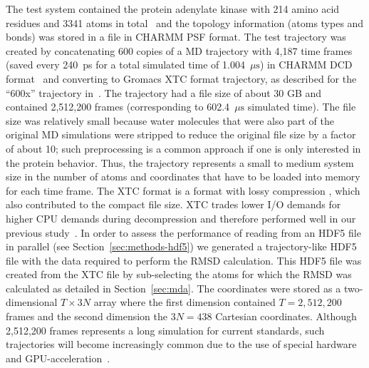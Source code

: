 The test system contained the protein adenylate kinase with 214 amino acid residues and 3341 atoms in total~\cite{Seyler:2014il} and the topology information (atoms types and bonds) was stored in a file in CHARMM PSF format.
The test trajectory was created by concatenating 600 copies of a MD trajectory with 4,187 time frames (saved every 240~ps for a total simulated time of 1.004~$\mu\text{s}$) in CHARMM DCD format~\cite{Seyler:2017aa} and converting to Gromacs XTC format trajectory, as described for the ``600x'' trajectory in~\citet{Khoshlessan:2017ab}.
The trajectory had a file size of about 30 GB and contained 2,512,200 frames (corresponding to 602.4~$\mu\text{s}$ simulated time).
The file size was relatively small because water molecules that were also part of the original MD simulations were stripped to reduce the original file size by a factor of about 10; such preprocessing is a common approach if one is only interested in the protein behavior.
Thus, the trajectory represents a small to medium system size in the number of atoms and coordinates that have to be loaded into memory for each time frame.
The XTC format is a format with lossy compression \cite{Lindahl01, Spangberg:2011zr}, which also contributed to the compact file size.
XTC trades lower I/O demands for higher CPU demands during decompression and therefore performed well in our previous study~\cite{Khoshlessan:2017ab}.
In order to assess the performance of reading from an HDF5 file in parallel (see Section~\ref{sec:methods-hdf5}) we generated a trajectory-like HDF5 file with the data required to perform the RMSD calculation.
This HDF5 file was created from the XTC file by sub-selecting the atoms for which the RMSD was calculated as detailed in Section~\ref{sec:mda}.
The coordinates were stored as a two-dimensional $T \times 3N$ array where the first dimension contained $T=2,512,200$ frames and the second dimension the $3N = 438$ Cartesian coordinates.
Although 2,512,200 frames represents a long simulation for current standards, such trajectories will become increasingly common due to the use of special hardware~\cite{Shaw:2009ly, Shaw:2014aa} and GPU-acceleration~\cite{Salomon-Ferrer:2013cr, Glaser:2015ys, Abraham:2015aa}.

